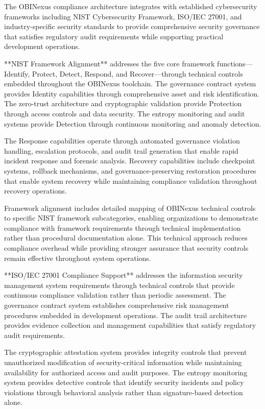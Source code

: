 The OBINexus compliance architecture integrates with established cybersecurity frameworks including NIST Cybersecurity Framework, ISO/IEC 27001, and industry-specific security standards to provide comprehensive security governance that satisfies regulatory audit requirements while supporting practical development operations.

**NIST Framework Alignment** addresses the five core framework functions—Identify, Protect, Detect, Respond, and Recover—through technical controls embedded throughout the OBINexus toolchain. The governance contract system provides Identity capabilities through comprehensive asset and risk identification. The zero-trust architecture and cryptographic validation provide Protection through access controls and data security. The entropy monitoring and audit systems provide Detection through continuous monitoring and anomaly detection.

The Response capabilities operate through automated governance violation handling, escalation protocols, and audit trail generation that enable rapid incident response and forensic analysis. Recovery capabilities include checkpoint systems, rollback mechanisms, and governance-preserving restoration procedures that enable system recovery while maintaining compliance validation throughout recovery operations.

Framework alignment includes detailed mapping of OBINexus technical controls to specific NIST framework subcategories, enabling organizations to demonstrate compliance with framework requirements through technical implementation rather than procedural documentation alone. This technical approach reduces compliance overhead while providing stronger assurance that security controls remain effective throughout system operations.

**ISO/IEC 27001 Compliance Support** addresses the information security management system requirements through technical controls that provide continuous compliance validation rather than periodic assessment. The governance contract system establishes comprehensive risk management procedures embedded in development operations. The audit trail architecture provides evidence collection and management capabilities that satisfy regulatory audit requirements.

The cryptographic attestation system provides integrity controls that prevent unauthorized modification of security-critical information while maintaining availability for authorized access and audit purposes. The entropy monitoring system provides detective controls that identify security incidents and policy violations through behavioral analysis rather than signature-based detection alone.

